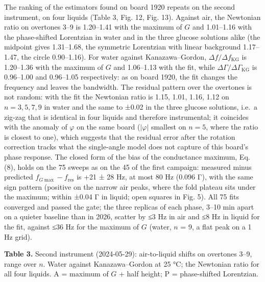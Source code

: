 \documentclass[11pt,a4paper]{article}
\begin{document}
The ranking of the estimators found on board 1920 repeats on the second
instrument, on four liquids (Table 3, Fig. 12, Fig. 13). Against air,
the Newtonian ratio on overtones 3--9 is 1.20--1.41 with the maximum of
\(G\) and 1.01--1.16 with the phase-shifted Lorentzian in water and in
the three glucose solutions alike (the midpoint gives 1.31--1.68, the
symmetric Lorentzian with linear background 1.17--1.47, the circle
0.90--1.16). For water against Kanazawa--Gordon,
\(\Delta f/\Delta f_\mathrm{KG}\) is 1.20--1.36 with the maximum of
\(G\) and 1.06--1.13 with the fit, while
\(\Delta\Gamma/\Delta\Gamma_\mathrm{KG}\) is 0.96--1.00 and 0.96--1.05
respectively: as on board 1920, the fit changes the frequency and leaves
the bandwidth. The residual pattern over the overtones is not random:
with the fit the Newtonian ratio is 1.15, 1.01, 1.16, 1.12 on
\(n = 3, 5, 7, 9\) in water and the same to ±0.02 in the three glucose
solutions, i.e.~a zig-zag that is identical in four liquids and
therefore instrumental; it coincides with the anomaly of \(\varphi\) on
the same board (\(|\varphi|\) smallest on \(n = 5\), where the ratio is
closest to one), which suggests that the residual error after the
rotation correction tracks what the single-angle model does not capture
of this board's phase response. The closed form of the bias of the
conductance maximum, Eq. (8), holds on the 75 sweeps as on the 45 of the
first campaign: measured minus predicted \(f_{G\max} - f_\mathrm{res}\)
is +21 ± 28 Hz, at most 80 Hz (0.096 Γ), with the same sign pattern
(positive on the narrow air peaks, where the fold plateau sits under the
maximum; within ±0.04 Γ in liquid; open squares in Fig. 5). All 75 fits
converged and passed the gate; the three replicas of each phase, 3--10
min apart on a quieter baseline than in 2026, scatter by ≤3 Hz in air
and ≤8 Hz in liquid for the fit, against ≤36 Hz for the maximum of \(G\)
(water, \(n\) = 9, a flat peak on a 1 Hz grid).

\textbf{Table 3.} Second instrument (2024-05-29): air-to-liquid shifts
on overtones 3--9, range over \(n\). Water against Kanazawa--Gordon at
25 °C; the Newtonian ratio for all four liquids. A = maximum of \(G\) +
half height; P = phase-shifted Lorentzian.
\end{document}
